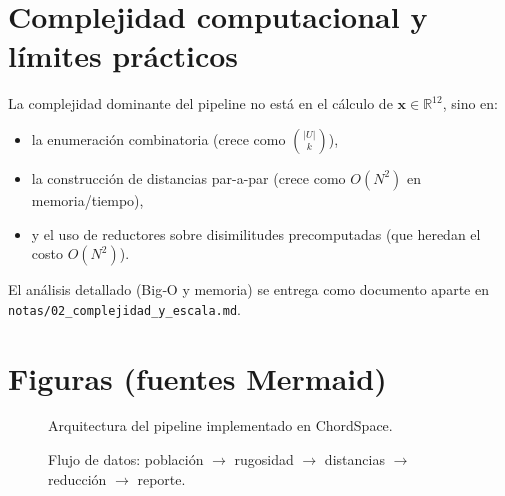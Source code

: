 \section{Complejidad computacional y límites prácticos}
\label{sec:complejidad}

La complejidad dominante del pipeline no está en el cálculo de $\mathbf{x}\in\mathbb{R}^{12}$, sino en:
\begin{itemize}
  \item la enumeración combinatoria (crece como $\binom{|U|}{k}$),
  \item la construcción de distancias par-a-par (crece como $O(N^2)$ en memoria/tiempo),
  \item y el uso de reductores sobre disimilitudes precomputadas (que heredan el costo $O(N^2)$).
\end{itemize}
El análisis detallado (Big‑O y memoria) se entrega como documento aparte en \texttt{notas/02\_complejidad\_y\_escala.md}.

\section{Figuras (fuentes Mermaid)}
\label{sec:figuras_mermaid}

\begin{figure}[ht]
\centering
{}
\caption{Arquitectura del pipeline implementado en ChordSpace.}
\end{figure}

\begin{figure}[ht]
\centering
{}
\caption{Flujo de datos: población $\rightarrow$ rugosidad $\rightarrow$ distancias $\rightarrow$ reducción $\rightarrow$ reporte.}
\end{figure}

